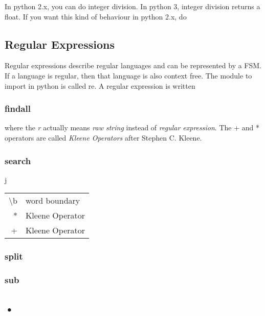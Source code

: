 \documentclass[12pt]{article}
\begin{document}
In python 2.x, you can do integer division. In python 3, integer division returns a float. If you want this kind of behaviour in python 2.x, do



\subsection{Regular Expressions}

Regular expressions describe regular languages and can be represented by a FSM.
If a language is regular, then that language is also context free.
The module to import in python is called re. A regular expression is written

\subsubsection{findall}


where the \emph{r} actually means \emph{raw string} instead of \emph{regular expression}. The + and * operators are called \emph{Kleene Operators} after Stephen C. Kleene.

\subsubsection{search}
j

\begin{tabular}{r | l}
	\textbackslash b & word boundary \\
	* & Kleene Operator \\
	+ & Kleene Operator
\end{tabular}

\subsubsection{split}


\subsubsection{sub}



\subsection*{•}
\end{document}
